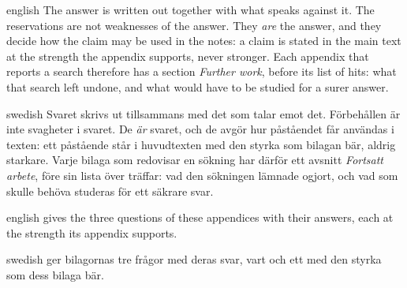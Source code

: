 \begin{onlyin}{english} %
The answer is written out together with what speaks against it.  The
reservations are not weaknesses of the answer.  They \emph{are} the
answer, and they decide how the claim may be used in the notes: a claim
is stated in the main text at the strength the appendix supports, never
stronger.  Each appendix that reports a search therefore has a section
\emph{Further work}, before its list of hits: what that search left undone, and
what
would have to be studied for a surer answer.
\end{onlyin}
\begin{onlyin}{swedish}
Svaret skrivs ut tillsammans med det som talar emot det.  Förbehållen är
inte svagheter i svaret.  De \emph{är} svaret, och de avgör hur
påståendet får användas i texten: ett påstående står i huvudtexten med
den styrka som bilagan bär, aldrig starkare.  Varje bilaga som redovisar
en sökning har därför ett avsnitt \emph{Fortsatt arbete}, före sin
lista över träffar: vad
den sökningen lämnade ogjort, och vad som skulle behöva studeras för ett
säkrare svar.
\end{onlyin}

\begin{onlyin}{english} %
 gives the three questions of these appendices
with their answers, each at the strength its appendix supports.
\end{onlyin}
\begin{onlyin}{swedish}
 ger bilagornas tre frågor med deras svar, vart
och ett med den styrka som dess bilaga bär.
\end{onlyin}

